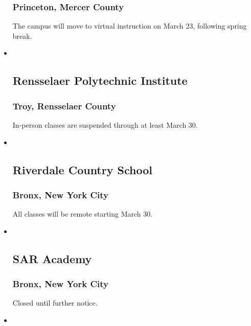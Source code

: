 \begin{itemize}
  \hypertarget{princeton-mercer-county}{%
  \subsubsection{Princeton, Mercer
  County}\label{princeton-mercer-county}}

  The campus will move to virtual instruction on March 23, following
  spring break.
\item ~
  \hypertarget{rensselaer-polytechnic-institute}{%
  \subsection{Rensselaer Polytechnic
  Institute}\label{rensselaer-polytechnic-institute}}

  \hypertarget{troy-rensselaer-county}{%
  \subsubsection{Troy, Rensselaer County}\label{troy-rensselaer-county}}

  In-person classes are suspended through at least March 30.
\item ~
  \hypertarget{riverdale-country-school}{%
  \subsection{Riverdale Country School}\label{riverdale-country-school}}

  \hypertarget{bronx-new-york-city-3}{%
  \subsubsection{Bronx, New York City}\label{bronx-new-york-city-3}}

  All classes will be remote starting March 30.
\item ~
  \hypertarget{sar-academy}{%
  \subsection{SAR Academy}\label{sar-academy}}

  \hypertarget{bronx-new-york-city-4}{%
  \subsubsection{Bronx, New York City}\label{bronx-new-york-city-4}}

  Closed until further notice.
\item ~
  \hypertarget{sar-high-school}{%
}
\end{itemize}
